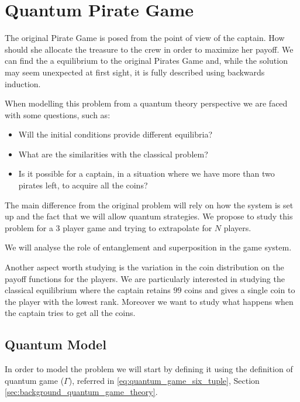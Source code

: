 \clearpage
\section{Quantum Pirate Game}
\label{sec:quantum_pirate}

The original Pirate Game is posed from the point of view of the captain. How should she allocate the treasure to the crew in order to maximize her payoff.
We can find the a equilibrium to the original Pirates Game and, while the solution may seem unexpected at first sight, it is fully described using backwards induction. 

When modelling this problem from a quantum theory perspective we are faced with some questions, such as:

\begin{itemize}
\item Will the initial conditions provide different equilibria? 

\item What are the similarities with the classical problem? 

\item Is it possible for a captain, in a situation where we have more than two pirates left, to acquire all the coins?

\end{itemize} 

The main difference from the original problem will rely on how the system is set up and the fact that we will allow quantum strategies. 
We propose to study this problem for a $3$ player game and trying to extrapolate for $N$ players. 

We will analyse the role of entanglement and superposition in the game system. 

Another aspect worth studying is the variation in the coin distribution on the payoff functions for the players. We are particularly interested in studying the classical equilibrium where the captain retains $99$ coins and gives a single coin to the player with the lowest rank. Moreover we want to study what happens when the captain tries to get all the coins.



\subsection{Quantum Model}
\label{subsec:description_2}

In order to model the problem we will start by defining it using the definition of quantum game ($\Gamma$), referred in \ref{eq:quantum_game_six_tuple}, Section \ref{sec:background_quantum_game_theory}\cite{Fra2011a}.

